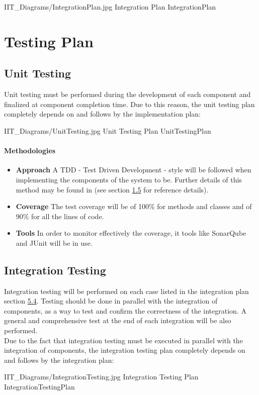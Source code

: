 \documentclass[../DD.tex]{subfiles}
\begin{document}
\image {13cm} {IIT_Diagrams/IntegrationPlan.jpg} {Integration Plan} {IntegrationPlan}
\newpage
\section{Testing Plan}
\subsection{Unit Testing}
Unit testing must be performed during the development of each component and finalized at component completion time. Due to this reason, the unit testing plan completely depends on and follows by the implementation plan:

\image {13cm} {IIT_Diagrams/UnitTesting.jpg} {Unit Testing Plan} {UnitTestingPlan}

\paragraph{Methodologies}
\begin{itemize}
	\item\textbf{Approach} A TDD - Test Driven Development - style will be followed when implementing the components of the system to be. Further details of this method may be found in  (see section \hyperref[sect:1.5]{1.5} for reference details).
	\item\textbf{Coverage} The test coverage will be of 100\% for methods and classes and of 90\% for all the lines of code.
	\item\textbf{Tools} In order to monitor effectively the coverage, it tools like SonarQube and JUnit will be in use.
\end{itemize} 

\subsection{Integration Testing} Integration testing will be performed on each case listed in the integration plan section \hyperref[sect:5.4]{5.4}. Testing should be done in parallel with the integration of components, as a way to test and confirm the correctness of the integration. A general and comprehensive test at the end of each integration will be also performed. \\
Due to the fact that integration testing must be executed in parallel with the integration of components, the integration testing plan completely depends on and follows by the integration plan:

\image {13cm} {IIT_Diagrams/IntegrationTesting.jpg} {Integration Testing Plan} {IntegrationTestingPlan}

\thispagestyle{fancy}
\end{document}
